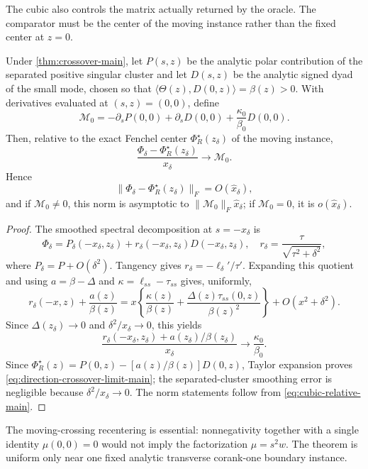 The cubic also controls the matrix actually returned by the oracle.  The
comparator must be the center of the moving instance rather than the fixed
center at \(z=0\).

\begin{corollary}
\label{cor:direction-crossover-main}
Under \cref{thm:crossover-main}, let \(P(s,z)\) be the analytic polar
contribution of the separated positive singular cluster and let \(D(s,z)\) be
the analytic signed dyad of the small mode, chosen so that
\(\langle\Theta(z),D(0,z)\rangle=\beta(z)>0\).  With derivatives evaluated at
\((s,z)=(0,0)\), define
 \begin{equation}
 \mathcal M_0=-\partial_sP(0,0)+\partial_sD(0,0)
 +\frac{\kappa_0}{\beta_0}D(0,0).
 \label{eq:direction-M0-main}
\end{equation}
Then, relative to the exact Fenchel center \(\Phi_R^\star(z_\delta)\) of the
moving instance,
\begin{equation}
 \frac{\Phi_\delta-\Phi_R^\star(z_\delta)}{x_\delta}
 \longrightarrow\mathcal M_0.
 \label{eq:direction-crossover-limit-main}
\end{equation}
Hence
\[
 \|\Phi_\delta-\Phi_R^\star(z_\delta)\|_F
 =O(\widehat x_\delta),
\]
and if \(\mathcal M_0\ne0\), this norm is asymptotic to
\(\|\mathcal M_0\|_F\widehat x_\delta\); if \(\mathcal M_0=0\), it is
\(o(\widehat x_\delta)\).
\end{corollary}

\begin{proof}
The smoothed spectral decomposition at \(s=-x_\delta\) is
\[
 \Phi_\delta=P_\delta(-x_\delta,z_\delta)
 +r_\delta(-x_\delta,z_\delta)D(-x_\delta,z_\delta),
 \quad
 r_\delta=\frac{\tau}{\sqrt{\tau^2+\delta^2}},
\]
where \(P_\delta=P+O(\delta^2)\).  Tangency gives
\(r_\delta=-\ell_\delta'/\tau'\).  Expanding this quotient and using
\(a=\beta-\Delta\) and
\(\kappa=\ell_{ss}-\tau_{ss}\) gives, uniformly,
\[
 r_\delta(-x,z)+\frac{a(z)}{\beta(z)}
 =x\left\{\frac{\kappa(z)}{\beta(z)}
 +\frac{\Delta(z)\tau_{ss}(0,z)}{\beta(z)^2}\right\}
 +O(x^2+\delta^2).
\]
Since \(\Delta(z_\delta)\to0\) and \(\delta^2/x_\delta\to0\), this yields
\[
 \frac{r_\delta(-x_\delta,z_\delta)+a(z_\delta)/\beta(z_\delta)}
 {x_\delta}\longrightarrow\frac{\kappa_0}{\beta_0}.
\]
Since
\(\Phi_R^\star(z)=P(0,z)-[a(z)/\beta(z)]D(0,z)\), Taylor expansion proves
\eqref{eq:direction-crossover-limit-main}; the separated-cluster smoothing
error is negligible because \(\delta^2/x_\delta\to0\).  The norm statements
follow from \eqref{eq:cubic-relative-main}.
\end{proof}

The moving-crossing recentering is essential: nonnegativity together with a
single identity \(\mu(0,0)=0\) would not imply the factorization
\(\mu=s^2w\).  The theorem is uniform only near one fixed analytic transverse
corank-one boundary instance.
